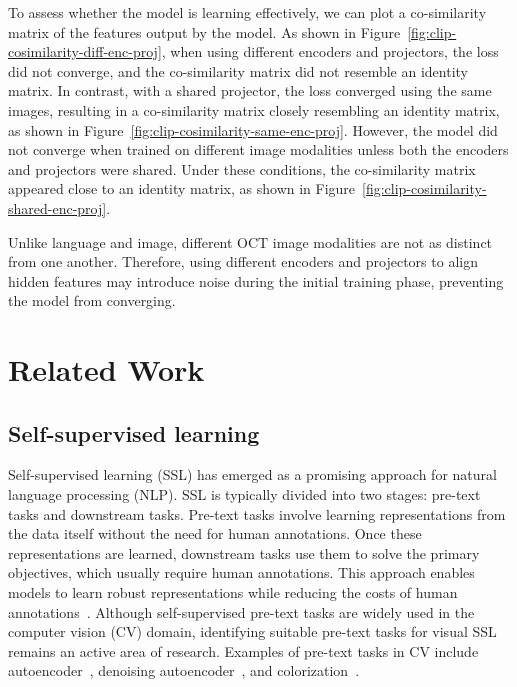 \documentclass[a4paper,11pt,oneside]{report}
\begin{document}
To assess whether the model is learning effectively, we can plot a co-similarity matrix of the features output by the model. As shown in Figure~\ref{fig:clip-cosimilarity-diff-enc-proj}, when using different encoders and projectors, the loss did not converge, and the co-similarity matrix did not resemble an identity matrix. In contrast, with a shared projector, the loss converged using the same images, resulting in a co-similarity matrix closely resembling an identity matrix, as shown in Figure~\ref{fig:clip-cosimilarity-same-enc-proj}. However, the model did not converge when trained on different image modalities unless both the encoders and projectors were shared. Under these conditions, the co-similarity matrix appeared close to an identity matrix, as shown in Figure~\ref{fig:clip-cosimilarity-shared-enc-proj}.

Unlike language and image, different OCT image modalities are not as distinct from one another. Therefore, using different encoders and projectors to align hidden features may introduce noise during the initial training phase, preventing the model from converging.
\chapter{Related Work}



\section{Self-supervised learning}
Self-supervised learning (SSL) has emerged as a promising approach for natural language processing (NLP). SSL is typically divided into two stages: pre-text tasks and downstream tasks. Pre-text tasks involve learning representations from the data itself without the need for human annotations. Once these representations are learned, downstream tasks use them to solve the primary objectives, which usually require human annotations. This approach enables models to learn robust representations while reducing the costs of human annotations~\cite{Jaiswal2020}. Although self-supervised pre-text tasks are widely used in the computer vision (CV) domain, identifying suitable pre-text tasks for visual SSL remains an active area of research. Examples of pre-text tasks in CV include autoencoder~\cite{Hinton2006}, denoising autoencoder~\cite{Vincent2008}, and colorization~\cite{Larsson2017}.
\end{document}
